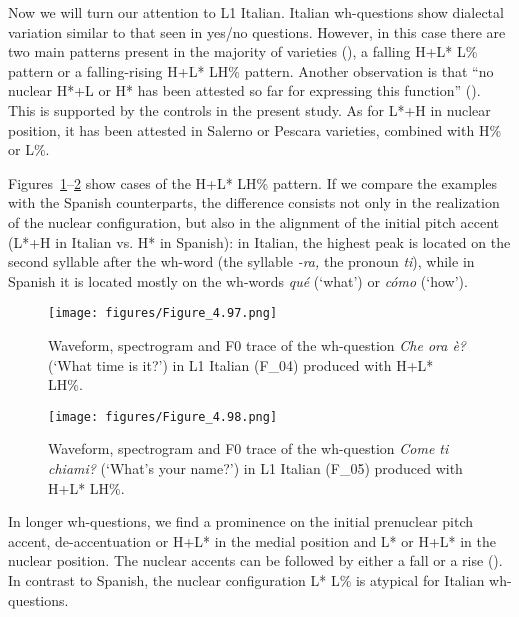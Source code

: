 Now we will turn our attention to L1 Italian. Italian wh-questions show dialectal variation similar to that seen in yes/no questions. However, in this case there are two main patterns present in the majority of varieties (\citealt{GiliFivelaEtAl2015}), a falling H+L* L\% pattern or a falling-rising H+L* LH\% pattern. Another observation is that “no nuclear H*+L or H* has been attested so far for expressing this function” (\citealt[178]{GiliFivelaEtAl2015}). This is supported by the controls in the present study. As for L*+H in nuclear position, it has been attested in Salerno or Pescara varieties, combined with H\% or L\%.



Figures~\ref{fig:4.97}--\ref{fig:4.98} show cases of the H+L* LH\% pattern. If we compare the examples with the Spanish counterparts, the difference consists not only in the realization of the nuclear configuration, but also in the alignment of the initial pitch accent (L*+H in Italian vs. H* in Spanish): in Italian, the highest peak is located on the second syllable after the wh-word (the syllable \textit{-ra,} the pronoun \textit{ti}), while in Spanish it is located mostly on the wh-words \textit{qué} (‘what’) or \textit{cómo} (‘how’).


\begin{figure}


\texttt{[image: figures/Figure\_4.97.png]}



\caption{Waveform, spectrogram and F0 trace of the wh-question \textit{Che ora è?} (‘What time is it?’) in L1 Italian (F\_04) produced with H+L* LH\%.}
\label{fig:4.97}
\end{figure}

\begin{figure}


\texttt{[image: figures/Figure\_4.98.png]}



\caption{Waveform, spectrogram and F0 trace of the wh-question \textit{Come ti chiami?} (‘What’s your name?’) in L1 Italian (F\_05) produced with H+L* LH\%.}
\label{fig:4.98}
\end{figure}

In longer wh-questions, we find a prominence on the initial prenuclear pitch accent, de-accentuation or H+L* in the medial position and L* or H+L* in the nuclear position. The nuclear accents can be followed by either a fall or a rise (). In contrast to Spanish, the nuclear configuration L* L\% is atypical for Italian wh-questions.

